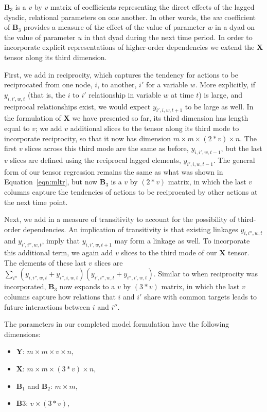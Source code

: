 \documentclass[3p,times,twocolumn,authoryear,12pt]{elsarticle}
\newcommand{\bl}[1]{{\mathbf #1}}
\begin{document}
$\bl B_3$ is a $v$ by $v$ matrix of coefficients representing the direct effects of the lagged dyadic, relational parameters on one another. In other words, the $u w$ coefficient of $\bl B_3$ provides a measure of the effect of the value of parameter $w$ in a dyad on the value of parameter $u$ in that dyad during the next time period. In order to incorporate explicit representations of higher-order dependencies we extend the $\bl X$ tensor along its third dimension. 

First, we add in reciprocity, which captures the tendency for actions to be reciprocated from one node, $i$, to another, $i'$ for a variable $w$. More explicitly, if $y_{i,i',w,t}$ (that is, the $i$ to $i'$ relationship in variable $w$ at time $t$) is large, and reciprocal relationships exist, we would expect $y_{i',i,w,t+1}$ to be large as well. In the formulation of $\bl X$ we have presented so far, its third dimension has length equal to $v$; we add $v$ additional slices to the tensor along its third mode to incorporate reciprocity, so that it now has dimension $m \times m \times (2*v) \times n$. The first $v$ slices across this third mode are the same as before, $y_{i,i',w,t-1}$, but the last $v$ slices are defined using the reciprocal lagged elements, $y_{i',i,w,t-1}$. The general form of our tensor regression remains the same as what was shown in Equation~\ref{eqn:mltr}, but now $\bl B_3$ is a $v$ by $(2*v)$ matrix, in which the last $v$ columns capture the tendencies of actions to be reciprocated by other actions at the next time point.

Next, we add in a measure of transitivity to account for the possibility of third-order dependencies. An implication of transitivity is that existing linkages $y_{i,i'',w,t}$ and $y_{i',i'',w,t}$, imply that $y_{i,i',w,t+1}$ may form a linkage as well. To incorporate this additional term, we again add $v$ slices to the third mode of our $\bl X$ tensor. The elements of these last $v$ slices are  $\sum_{i''} ( y_{i,i'',w,t} + y_{i'',i,w,t}) ( y_{i',i'',w,t} + y_{i'',i',w,t})$. Similar to when reciprocity was incorporated, $\bl B_3$ now expands to a $v$ by $(3*v)$ matrix, in which the last $v$ columns capture how relations that $i$ and $i'$ share with common targets leads to future interactions between $i$ and $i''$.

The parameters in our completed model formulation have the following dimensions: 

\begin{itemize}
	\item $\bl Y$: $m \times m \times v \times n$, 
	\item $\bl X$: $m \times m \times (3*v) \times n$, 	
	\item $\bl B_{1}$ and $\bl B_{2}$: $m \times m$, 	
	\item $\bl B3$: $v \times (3*v)$,
\end{itemize}
\end{document}
